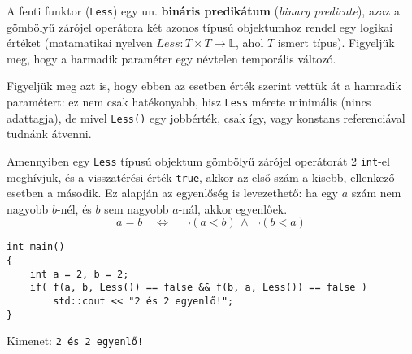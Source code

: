 \documentclass[a4paper,11.5pt,table]{article}
\begin{document}
	A fenti funktor (\texttt{Less}) egy un. \textbf{bináris predikátum} (\textit{binary predicate}), azaz a gömbölyű zárójel operátora két azonos típusú objektumhoz rendel egy logikai értéket (matamatikai nyelven $Less: T\times T \to \mathbb{L}$, ahol $T$ ismert típus). Figyeljük meg, hogy a harmadik paraméter egy névtelen temporális változó. 
	
	\begin{note}
		Figyeljük meg azt is, hogy ebben az esetben érték szerint vettük át a hamradik paramétert: ez nem csak hatékonyabb, hisz \texttt{Less} mérete minimális (nincs adattagja), de mivel \texttt{Less()} egy jobbérték, csak így, vagy konstans referenciával tudnánk átvenni.
	\end{note}
	
	Amennyiben egy \texttt{Less} típusú objektum gömbölyű zárójel operátorát 2 \texttt{int}-el meghívjuk, és a visszatérési érték \texttt{true}, akkor az első szám a kisebb, ellenkező esetben a második. Ez alapján az egyenlőség is levezethető: ha egy $a$ szám nem nagyobb $b$-nél, és $b$ sem nagyobb $a$-nál, akkor egyenlőek. 
	\[a = b \quad \Leftrightarrow \quad \neg(a<b)\, \wedge\, \neg(b<a)\]
	\begin{lstlisting}
int main()
{
	int a = 2, b = 2;
	if( f(a, b, Less()) == false && f(b, a, Less()) == false )
		std::cout << "2 és 2 egyenlő!";
}
	\end{lstlisting}
	Kimenet: \texttt{2 és 2 egyenlő!}
	\smallskip
	
\end{document}
